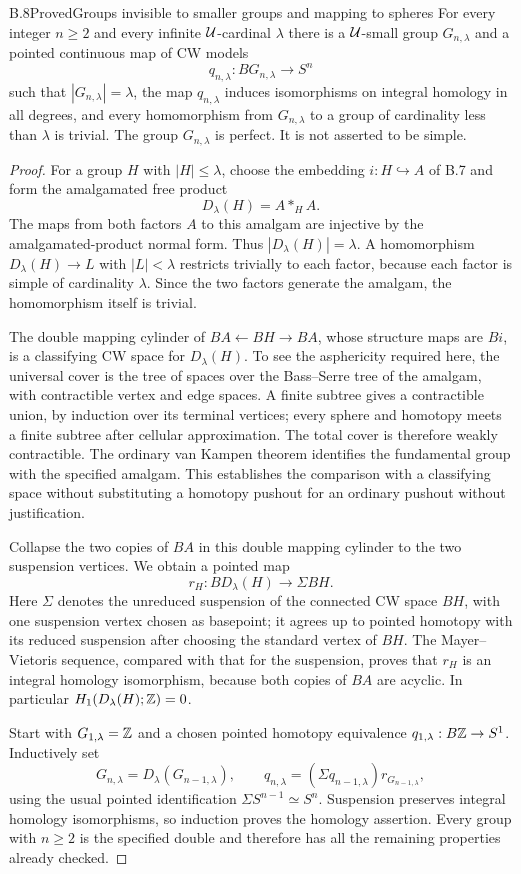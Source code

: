 \begin{claim}{B.8}{Proved}{Groups invisible to smaller groups and mapping to spheres}
For every integer $n\geq2$ and every infinite $\mathcal U$-cardinal $\lambda$
there is a $\mathcal U$-small group $G_{n,\lambda}$ and a pointed continuous map
of CW models
\[
 q_{n,\lambda}:BG_{n,\lambda}\longrightarrow S^n
\]
such that $|G_{n,\lambda}|=\lambda$, the map $q_{n,\lambda}$ induces
isomorphisms on integral homology in all degrees, and every homomorphism
from $G_{n,\lambda}$ to a group of cardinality less than $\lambda$ is
trivial.  The group $G_{n,\lambda}$ is perfect.  It is not asserted to be
simple.
\end{claim}
\begin{proof}
For a group $H$ with $|H|\leq\lambda$, choose the embedding
$i:H\hookrightarrow A$ of B.7 and form the amalgamated free product
\[
 D_\lambda(H)=A*_{H}A.
\]
The maps from both factors $A$ to this amalgam are injective by the
amalgamated-product normal form.  Thus $|D_\lambda(H)|=\lambda$.
A homomorphism $D_\lambda(H)\to L$ with $|L|<\lambda$ restricts
trivially to each factor, because each factor is simple of cardinality
$\lambda$.  Since the two factors generate the amalgam, the homomorphism
itself is trivial.

The double mapping cylinder of
$BA\leftarrow BH\rightarrow BA$, whose structure maps are $Bi$, is a
classifying CW space for $D_\lambda(H)$.  To see the asphericity required
here, the universal cover is the tree of spaces over the Bass--Serre
tree of the amalgam, with contractible vertex and edge spaces.  A finite
subtree gives a contractible union, by induction over its terminal
vertices; every sphere and homotopy meets a finite subtree after cellular
approximation.  The total cover is therefore weakly contractible.  The
ordinary van Kampen theorem identifies the fundamental group with the
specified amalgam.  This establishes the comparison with a classifying
space without substituting a homotopy pushout for an ordinary pushout
without justification.

Collapse the two copies of $BA$ in this double mapping cylinder to the
two suspension vertices.  We obtain a pointed map
\[
 r_H:B D_\lambda(H)\longrightarrow \Sigma BH.
\]
Here $\Sigma$ denotes the unreduced suspension of the connected CW
space $BH$, with one suspension vertex chosen as basepoint; it agrees
up to pointed homotopy with its reduced suspension after choosing the
standard vertex of $BH$.  The Mayer--Vietoris sequence, compared with
that for the suspension, proves that $r_H$ is an integral homology
isomorphism, because both copies of $BA$ are acyclic.  In particular
$H_1(D_\lambda(H);\mathbb Z)=0$.

Start with $G_{1,\lambda}=\mathbb Z$ and a chosen pointed homotopy equivalence
$q_{1,\lambda}:B\mathbb Z\to S^1$.  Inductively set
\[
 G_{n,\lambda}=D_\lambda(G_{n-1,\lambda}),\qquad
 q_{n,\lambda}=(\Sigma q_{n-1,\lambda})r_{G_{n-1,\lambda}},
\]
using the usual pointed identification $\Sigma S^{n-1}\simeq S^n$.
Suspension preserves integral homology isomorphisms, so induction proves
the homology assertion.  Every group with $n\geq2$ is the specified
double and therefore has all the remaining properties already checked.
\end{proof}

